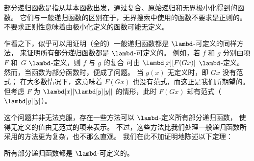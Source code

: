 \documentclass[../../../include/open-logic-section]{subfiles}
\begin{document}

部分递归函数是指从基本函数出发，通过复合、原始递归和无界极小化得到的函数。
它们与一般递归函数的区别在于，无界搜索中使用的函数不要求是正则的。
不要求正则性意味着由极小化定义的函数可能无定义。

乍看之下，似乎可以用证明（全的）一般递归函数都是 $\lambd$-可定义的同样方法，
来证明所有部分递归函数都是 $\lambd$-可定义的。
例如，若 $f$ 和 $g$ 分别由项 $F$ 和~$G$ $\lambd$-定义，则 $f$ 与 $g$ 的复合
可由 $\lambd[x][F (G x)]$ $\lambd$-定义。
然而，当函数为部分函数时，便成了问题。
当 $g(x)$ 无定义时，即 $G x$ 没有范式；
在大多数情况下，这意味着 $F (G x)$ 也没有范式，而这正是我们所期望的。
但考虑 $F$ 为 $\lambd[x][\lambd[y][y]]$ 的情形，此时 $F (G x)$ 却有范式（$\lambd[y][y]$）。

这个问题并非无法克服，存在一些方法可以 $\lambd$-定义所有部分递归函数，
使得无定义的值由无范式的项来表示。
不过，这些方法比我们处理一般递归函数所采用的方法更为复杂，也不那么直观。
我们在此不加证明地陈述以下定理：

\begin{thm}
  所有部分递归函数都是 $\lambd$-可定义的。
\end{thm}
\end{document}
